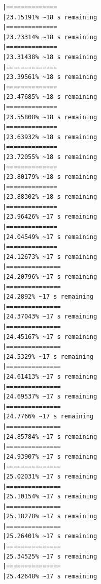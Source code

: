 \documentclass{article}\usepackage[]{graphicx}\usepackage[]{xcolor}
\makeatletter
\newenvironment{kframe}{%
 \def\at@end@of@kframe{}%
 \ifinner\ifhmode%
  \def\at@end@of@kframe{\end{minipage}}%
  \begin{minipage}{\columnwidth}%
 \fi\fi%
 \def\FrameCommand##1{\hskip\@totalleftmargin \hskip-\fboxsep
 \colorbox{shadecolor}{##1}\hskip-\fboxsep
     \hskip-\linewidth \hskip-\@totalleftmargin \hskip\columnwidth}%
 \MakeFramed {\advance\hsize-\width
   \@totalleftmargin\z@ \linewidth\hsize
   \@setminipage}}%
 {\par\unskip\endMakeFramed%
 \at@end@of@kframe}
\newenvironment{knitrout}{}{} %
\makeatother
\begin{document}
\begin{knitrout}
\begin{kframe}
\begin{verbatim}
|==============                                                |23.15191% ~18 s remaining 
|==============                                                |23.23314% ~18 s remaining 
|==============                                                |23.31438% ~18 s remaining 
|==============                                                |23.39561% ~18 s remaining 
|==============                                                |23.47685% ~18 s remaining 
|==============                                                |23.55808% ~18 s remaining 
|==============                                                |23.63932% ~18 s remaining 
|==============                                                |23.72055% ~18 s remaining 
|==============                                                |23.80179% ~18 s remaining 
|==============                                                |23.88302% ~18 s remaining 
|==============                                                |23.96426% ~17 s remaining 
|==============                                                |24.04549% ~17 s remaining 
|==============                                                |24.12673% ~17 s remaining 
|===============                                               |24.20796% ~17 s remaining 
|===============                                               |24.2892% ~17 s remaining  
|===============                                               |24.37043% ~17 s remaining 
|===============                                               |24.45167% ~17 s remaining 
|===============                                               |24.5329% ~17 s remaining  
|===============                                               |24.61413% ~17 s remaining 
|===============                                               |24.69537% ~17 s remaining 
|===============                                               |24.7766% ~17 s remaining  
|===============                                               |24.85784% ~17 s remaining 
|===============                                               |24.93907% ~17 s remaining 
|===============                                               |25.02031% ~17 s remaining 
|===============                                               |25.10154% ~17 s remaining 
|===============                                               |25.18278% ~17 s remaining 
|===============                                               |25.26401% ~17 s remaining 
|===============                                               |25.34525% ~17 s remaining 
|===============                                               |25.42648% ~17 s remaining 

\end{verbatim}
\end{kframe}
\end{knitrout}
\end{document}
